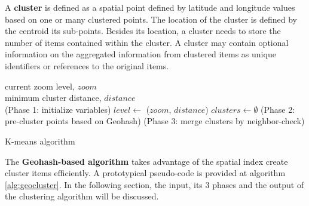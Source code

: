 A \textbf{cluster} is defined as a spatial point defined by latitude and longitude values based on one or many clustered points. The location of the cluster is defined by the centroid its sub-points. Besides its location, a cluster needs to store the number of items contained within the cluster. A cluster may contain optional information on the aggregated information from clustered items as unique identifiers or references to the original items.      

\newlength{}
\newcommand\myinput[1]{%
  \settowidth\inputlen{\KwIn{}}%
  \setlength\hangindent{\inputlen}%
  \hspace*{\inputlen}#1\\}

\begin{algorithm}[t]
  \myinput{current zoom level, $zoom$}
  \myinput{minimum cluster distance, $distance$}
  \BlankLine
  \Begin(Phase 1: initialize variables){
  	$level \leftarrow$ \getClusterLevel($zoom$, $distance$)\;
  	$clusters \leftarrow \emptyset$\;
  }
  \Begin(Phase 2: pre-cluster points based on Geohash){
  }
  \Begin(Phase 3: merge clusters by neighbor-check){
  }
  \BlankLine

  \caption{K-means algorithm~\cite{Meert06clustermaps}}
  \label{alg:geocluster}
\end{algorithm}

The \textbf{Geohash-based algorithm} takes advantage of the spatial index create cluster items efficiently. A prototypical pseudo-code is provided at algorithm \ref{alg:geocluster}. In the following section, the input, its 3 phases and the output of the clustering algorithm will be discussed.

